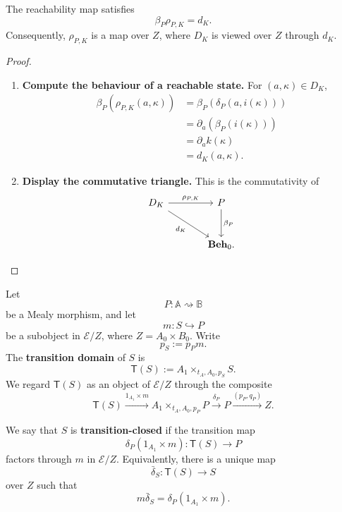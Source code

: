 \begin{lemma}
\label{lem:reachability-map-over-base}
    The reachability map satisfies
    \[
        \beta_P\rho_{P,K}=d_K.
    \]
    Consequently, \(\rho_{P,K}\) is a map over \(Z\), where \(D_K\) is viewed over \(Z\) through \(d_K\).
\end{lemma}
\begin{proof}
    \leavevmode
    \begin{enumerate}
        \item \textbf{Compute the behaviour of a reachable state.} For \((a,\kappa)\in D_K\),
        \[
            \begin{aligned}
                \beta_P(\rho_{P,K}(a,\kappa))
                &=
                \beta_P(\delta_P(a,i(\kappa)))
                \\
                &=
                \partial_a(\beta_P(i(\kappa)))
                \\
                &=
                \partial_a k(\kappa)
                \\
                &=
                d_K(a,\kappa).
            \end{aligned}
        \]

        \item \textbf{Display the commutative triangle.} This is the commutativity of
        \[
            \begin{tikzcd}[column sep=large, row sep=large]
                    D_K
                        \arrow[r, "\rho_{P,K}"]
                        \arrow[dr, "d_K"']
                &
                    P
                        \arrow[d, "\beta_P"]
                \\
                &
                    \mathbf{Beh}_0.
            \end{tikzcd}
        \]
    \end{enumerate}
\end{proof}

\begin{definition}
\label{def:transition-closed-subobject}
    Let
    \[
        P:\mathbb A\rightsquigarrow\mathbb B
    \]
    be a Mealy morphism, and let
    \[
        m:S\hookrightarrow P
    \]
    be a subobject in \(\mathcal E/Z\), where \(Z=A_0\times B_0\). Write
    \[
        p_S:=p_Pm.
    \]
    The \textbf{transition domain} of \(S\) is
    \[
        \mathsf T(S):=
        A_1\times_{t_A,A_0,p_S}S.
    \]
    We regard \(\mathsf T(S)\) as an object of \(\mathcal E/Z\) through the composite
    \[
        \mathsf T(S)
            \xrightarrow{1_{A_1}\times m}
        A_1\times_{t_A,A_0,p_P}P
            \xrightarrow{\delta_P}
        P
            \xrightarrow{(p_P,q_P)}
        Z.
    \]

    We say that \(S\) is \textbf{transition-closed} if the transition map
    \[
        \delta_P(1_{A_1}\times m):
        \mathsf T(S)\to P
    \]
    factors through \(m\) in \(\mathcal E/Z\). Equivalently, there is a unique map
    \[
        \bar\delta_S:\mathsf T(S)\to S
    \]
    over \(Z\) such that
    \[
        m\bar\delta_S
        =
        \delta_P(1_{A_1}\times m).
    \]
\end{definition}

